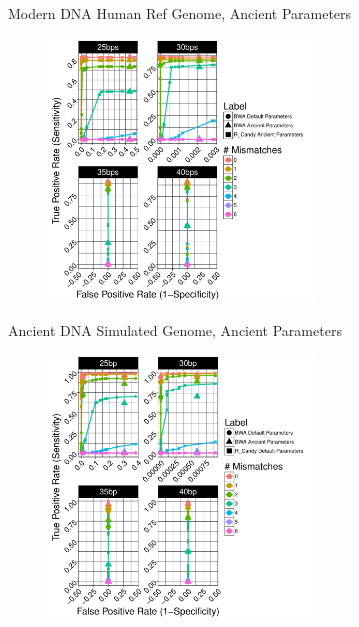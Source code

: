 \documentclass{beamer}
\begin{document}
\begin{frame}{\small{Modern DNA Human Ref Genome, Ancient Parameters}}
	\begin{figure}[H]
		\centering
		\includegraphics[width=7cm]{pics/f_DS9_22_20_54_emp.pdf}
		
	\end{figure}

\end{frame}
\begin{frame}{\small{Ancient DNA Simulated Genome, Ancient Parameters}}
	
	\begin{figure}[H]
		\centering
		\includegraphics[width=7cm]{pics/f_DS1_emp.pdf}
		
	\end{figure}

\end{frame}
\end{document}
